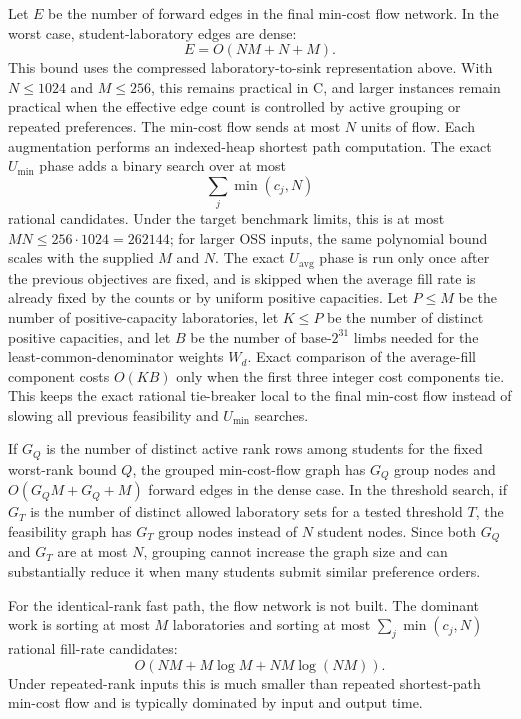\documentclass[11pt,a4paper]{article}
\begin{document}
Let \(E\) be the number of forward edges in the final min-cost flow network.
In the worst case, student-laboratory edges are dense:
\[
  E = O(NM + N + M).
\]
This bound uses the compressed laboratory-to-sink representation above.  With
\(N\leq1024\) and \(M\leq256\), this remains practical in C, and larger
instances remain practical when the effective edge count is controlled by
active grouping or repeated preferences.  The min-cost flow sends at most
\(N\) units of flow.  Each augmentation performs an
indexed-heap shortest path computation.  The exact \(U_{\min}\) phase adds a
binary search over at most
\[
  \sum_j \min(c_j,N)
\]
rational candidates.  Under the target benchmark limits, this is at most
\(MN\le 256\cdot1024=262144\); for larger OSS inputs, the same polynomial
bound scales with the supplied \(M\) and \(N\).
The exact \(U_{\mathrm{avg}}\) phase is run only once after the previous
objectives are fixed, and is skipped when the average fill rate is already
fixed by the counts or by uniform positive capacities.  Let \(P\leq M\) be
the number of positive-capacity laboratories, let \(K\leq P\) be the number
of distinct positive capacities, and let \(B\) be the number of base-\(2^{31}\)
limbs needed for the least-common-denominator weights \(W_d\).  Exact
comparison of the average-fill component costs \(O(KB)\) only when the first
three integer cost components tie.  This keeps the exact rational tie-breaker
local to the final min-cost flow instead of slowing all previous feasibility
and \(U_{\min}\) searches.

If \(G_Q\) is the number of distinct active rank rows among students for the
fixed worst-rank bound \(Q\), the grouped min-cost-flow graph has \(G_Q\)
group nodes and \(O(G_QM+G_Q+M)\) forward edges in the dense case.  In the
threshold search, if \(G_T\) is the number of distinct allowed laboratory sets
for a tested threshold \(T\), the feasibility graph has \(G_T\) group nodes
instead of \(N\) student nodes.  Since both \(G_Q\) and \(G_T\) are at most
\(N\), grouping cannot increase the graph size and can substantially reduce it
when many students submit similar preference orders.

For the identical-rank fast path, the flow network is not built.  The dominant
work is sorting at most \(M\) laboratories and sorting at most
\(\sum_j \min(c_j,N)\) rational fill-rate candidates:
\[
  O(NM + M\log M + NM\log(NM)).
\]
Under repeated-rank inputs this is much smaller than repeated shortest-path
min-cost flow and is typically dominated by input and output time.
\end{document}
